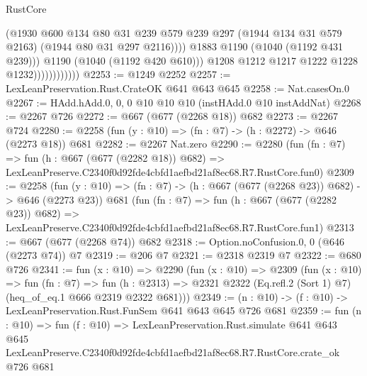 \begin{lexlean}{RustCore}
\begin{coremodule}
                                    (@1930
                                      @600
                                      @134
                                      @80
                                      @31
                                      @239
                                      @579
                                      @239
                                      @297
                                      (@1944 @134 @31 @579 @2163)
                                      (@1944 @80 @31 @297 @2116))))
                                @1883
                                @1190
                                (@1040 (@1192 @431 @239)))
                              @1190
                              (@1040 (@1192 @420 @610)))
                            @1208
                            @1212
                            @1217
                            @1222
                            @1228
                            @1232))))))))))))
@2253 := @1249 @2252
@2257 := LexLeanPreservation.Rust.CrateOK @641 @643 @645
@2258 := Nat.casesOn.{0}
@2267 := HAdd.hAdd.{0, 0, 0} @10 @10 @10 (instHAdd.{0} @10 instAddNat)
@2268 := @2267 @726
@2272 := @667 (@677 (@2268 @18)) @682
@2273 := @2267 @724
@2280 := @2258 (fun (y : @10) => (fn : @7) -> (h : @2272) -> @646 (@2273 @18)) @681
@2282 := @2267 Nat.zero
@2290 := @2280
    (fun (fn : @7) =>
    fun (h : @667 (@677 (@2282 @18)) @682) =>
    LexLeanPreserve.C2340f0d92fde4cbfd1aefbd21af8ec68.R7.RustCore.fun0)
@2309 := @2258
    (fun (y : @10) => (fn : @7) -> (h : @667 (@677 (@2268 @23)) @682) -> @646 (@2273 @23))
    @681
    (fun (fn : @7) =>
    fun (h : @667 (@677 (@2282 @23)) @682) =>
    LexLeanPreserve.C2340f0d92fde4cbfd1aefbd21af8ec68.R7.RustCore.fun1)
@2313 := @667 (@677 (@2268 @74)) @682
@2318 := Option.noConfusion.{0, 0} (@646 (@2273 @74)) @7
@2319 := @206 @7
@2321 := @2318 @2319 @7
@2322 := @680 @726
@2341 := fun (x : @10) =>
  @2290
    (fun (x : @10) =>
    @2309
      (fun (x : @10) =>
      fun (fn : @7) =>
      fun (h : @2313) =>
      @2321 @2322 (Eq.refl.{2} (Sort 1) @7) (heq_of_eq.{1} @666 @2319 @2322 @681)))
@2349 := (n : @10) -> (f : @10) -> LexLeanPreservation.Rust.FunSem @641 @643 @645 @726 @681
@2359 := fun (n : @10) =>
  fun (f : @10) =>
  LexLeanPreservation.Rust.simulate
    @641
    @643
    @645
    LexLeanPreserve.C2340f0d92fde4cbfd1aefbd21af8ec68.R7.RustCore.crate_ok
    @726
    @681
\end{coremodule}
\end{lexlean}
